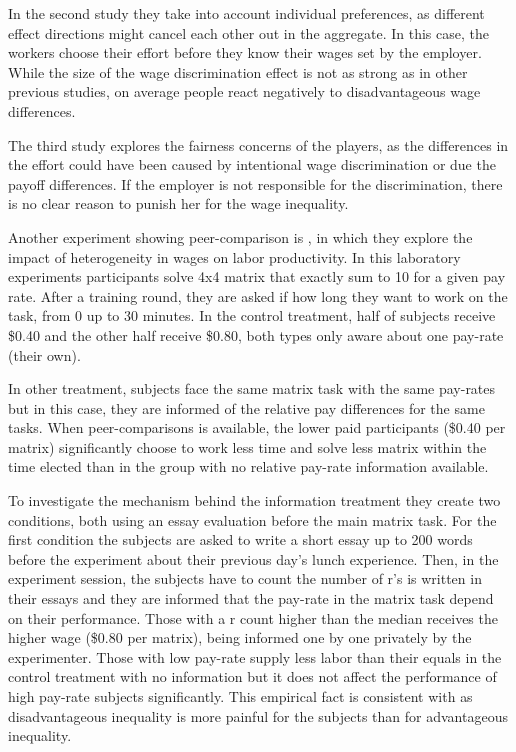 \documentclass[a4paper, 12pt]{article}
\begin{document}
In the second study they take into account individual preferences, as different effect directions might cancel each other out in the aggregate. In this case, the workers choose their effort before they know their wages set by the employer. While the size of the wage discrimination effect is not as strong as in other previous studies, on average people react negatively to disadvantageous wage differences.  

The third study explores the fairness concerns of the players, as the differences in the effort could have been caused by intentional wage discrimination or due the payoff differences. If the employer is not responsible for the discrimination, there is no clear reason to punish her for the wage inequality. 
  
Another experiment showing peer-comparison is \cite{Bracha2012}, in which they explore the impact of heterogeneity in wages on labor productivity. In this laboratory experiments participants solve 4x4 matrix that exactly sum to 10 for a given pay rate. After a training round, they are asked if how long they want to work on the task, from 0 up to 30 minutes. In the control treatment, half of subjects receive \$0.40 and the other half receive \$0.80, both types only aware about one pay-rate (their own). 

In other treatment, subjects face the same matrix task with the same pay-rates but in this case, they are informed of the relative pay differences for the same tasks. When peer-comparisons is available, the lower paid participants (\$0.40 per matrix) significantly choose to work less time and solve less matrix within the time elected than in the group with no relative pay-rate information available.
 
To investigate the mechanism behind the information treatment they create two conditions, both using an essay evaluation before the main matrix task. For the first condition the subjects are asked to write a short essay up to 200 words before the experiment about their previous day’s lunch experience. Then, in the experiment session, the subjects have to count the number of r’s is written in their essays and they are informed that the pay-rate in the matrix task depend on their performance. Those with a r count higher than the median receives the higher wage (\$0.80 per matrix), being informed one by one privately by the experimenter. Those with low pay-rate supply less labor than their equals in the control treatment with no information but it does not affect the performance of high pay-rate subjects significantly. This empirical fact is consistent with \cite{ Fehr1999} as disadvantageous inequality is more painful for the subjects than for advantageous inequality.
 
\end{document}
